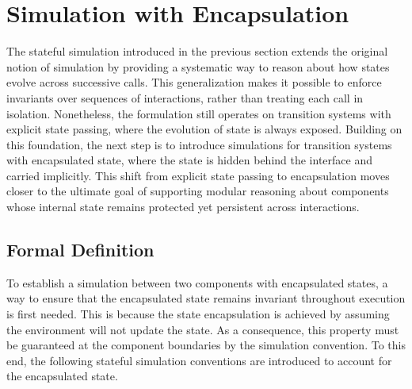 \section{Simulation with Encapsulation}
\label{sec:oe:sim-encap}

The stateful simulation introduced
in the previous section extends the original notion of simulation
by providing a systematic way
to reason about how states evolve
across successive calls.
This generalization makes it possible
to enforce invariants over sequences of interactions,
rather than treating each call
in isolation.
Nonetheless,
the formulation still operates on transition systems
with explicit state passing,
where the evolution of state is always exposed.
Building on this foundation,
the next step is to introduce simulations
for transition systems with encapsulated state,
where the state is hidden
behind the interface and carried implicitly.
This shift from explicit state passing
to encapsulation moves closer
to the ultimate goal of supporting modular reasoning
about components whose internal state remains protected
yet persistent across interactions.

\subsection{Formal Definition}

To establish a simulation between two components with encapsulated states,
a way to ensure
that the encapsulated state remains invariant
throughout execution is first needed.
This is because
the state encapsulation
is achieved by assuming
the environment will not update the state.
As a consequence,
this property must be
guaranteed at the component boundaries
by the simulation convention.
To this end,
the following
stateful simulation conventions
are introduced
to account for the encapsulated state.


